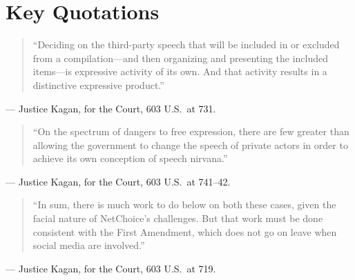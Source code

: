 \documentclass[12pt]{article}
\begin{document}
\section{Key Quotations}

\begin{quote}
``Deciding on the third-party speech that will be included in or excluded from a compilation---and then organizing and presenting the included items---is expressive activity of its own. And that activity results in a distinctive expressive product.''
\end{quote}
\noindent --- Justice Kagan, for the Court, 603 U.S.\ at 731.

\begin{quote}
``On the spectrum of dangers to free expression, there are few greater than allowing the government to change the speech of private actors in order to achieve its own conception of speech nirvana.''
\end{quote}
\noindent --- Justice Kagan, for the Court, 603 U.S.\ at 741--42.

\begin{quote}
``In sum, there is much work to do below on both these cases, given the facial nature of NetChoice's challenges. But that work must be done consistent with the First Amendment, which does not go on leave when social media are involved.''
\end{quote}
\noindent --- Justice Kagan, for the Court, 603 U.S.\ at 719.
\end{document}
